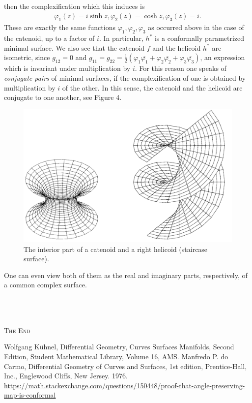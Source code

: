 \documentclass[a4paper]{article}
\numberwithin{equation}{section}
\begin{document}
then the complexification which this induces is
\begin{align}
{\varphi _1}\left( z \right) = i\sinh z,{\varphi _2}\left( z \right) = \cosh z,{\varphi _3}\left( z \right) = i.
\end{align}
These are exactly the same functions $\varphi_1,\varphi_2,\varphi_3$ as occurred above in the case of the catenoid, up to a factor of $i$. In particular, $h^*$ is a conformally parametrized minimal surface. We also see that the catenoid $f$ and the helicoid $h^*$ are isometric, since $g_{12}=0$ and ${g_{11}} = {g_{22}} = \frac{1}{2}\left( {{\varphi _1}\overline {{\varphi _1}}  + {\varphi _2}\overline {{\varphi _2}}  + {\varphi _3}\overline {{\varphi _3}} } \right)$, an expression which is invariant under multiplication by $i$. For this reason one speaks of \textit{conjugate pairs} of minimal surfaces, if the complexification of one is obtained by multiplication by $i$ of the other. In this sense, the catenoid and the helicoid are conjugate to one another, see Figure 4.
\begin{figure}[H]
\includegraphics[scale=0.42]{2}
\caption{The interior part of a catenoid and a right helicoid (staircase surface).}
\end{figure}
One can even view both of them as the real and imaginary parts, respectively, of a common complex surface.\\
\\
\\
\\
\begin{center}
\textsc{The End}
\end{center}
\newpage
\begin{thebibliography}{999}
 Wolfgang K\"{u}hnel, Differential Geometry, Curves Surfaces Manifolds, Second Edition, Student Mathematical Library, Volume 16, AMS.
 Manfredo P. do Carmo, Differential Geometry of Curves and Surfaces, 1st edition, Prentice-Hall, Inc., Englewood Cliffs, New Jersey. 1976.
 \url{https://math.stackexchange.com/questions/150448/proof-that-angle-preserving-map-is-conformal}
\end{thebibliography}
\end{document}
